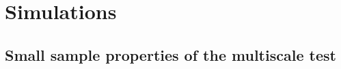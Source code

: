 

\section{Simulations}\label{sec-sim}




\subsection{Small sample properties of the multiscale test}\label{subsec-sim-multiscale}


